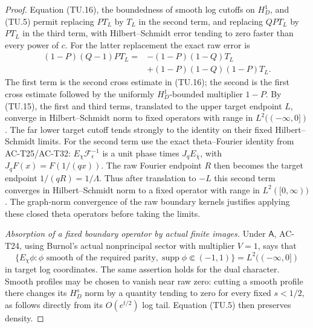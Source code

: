 \begin{proof}
Equation (TU.16), the boundedness of smooth log cutoffs
on \(H_D^1\), and (TU.5) permit replacing \(PT_L\) by
\(T_L\) in the second term, and replacing \(QPT_L\) by
\(PT_L\) in the third term, with Hilbert--Schmidt error
tending to zero faster than every power of \(c\).
For the latter replacement the exact raw error is
\[
 \begin{split}
 (1-P)(Q-1)PT_L
   ={}&-(1-P)(1-Q)T_L\\
      &+(1-P)(1-Q)(1-P)T_L.
 \end{split}
 \tag{TU.16a}
\]
The first term is the second cross estimate in (TU.16);
the second is the first cross estimate followed by the
uniformly \(H_D^1\)-bounded multiplier \(1-P\).
By (TU.15), the first and third terms, translated to the
upper target endpoint \(L\), converge in Hilbert--Schmidt
norm to fixed operators with range in \(L^2((-\infty,0])\).
The far lower target cutoff tends strongly to the identity
on their fixed Hilbert--Schmidt limits.
For the second term use the exact theta--Fourier identity
from AC-T25/AC-T32:
\(E_\chi\mathcal F_\epsilon^{-1}\) is a unit phase times
\(J_qE_{\bar\chi}\), with \(J_qF(x)=F(1/(qx))\).
The raw Fourier endpoint \(R\) then becomes the target
endpoint \(1/(qR)=1/\Lambda\).
Thus after translation to \(-L\) this second term converges
in Hilbert--Schmidt norm to a fixed operator with range
in \(L^2([0,\infty))\).
The graph-norm convergence of the raw boundary kernels
justifies applying these closed theta operators before
taking the limits.

\emph{Absorption of a fixed boundary operator by actual finite images.}
Under \(\mathsf A\), AC-T24, using Burnol's actual
nonprincipal sector with multiplier \(V=1\), says that
\[
 \overline{\{E_\chi\phi:
          \phi\text{ smooth of the required parity},
                    \operatorname{supp}\phi\Subset(-1,1)\}}
                  =L^2((-\infty,0])
 \tag{TU.18}
\]
in target log coordinates.
The same assertion holds for the dual character.
Smooth profiles may be chosen to vanish near raw zero:
cutting a smooth profile there changes its \(H_D^s\) norm
by a quantity tending to zero for every fixed \(s<1/2\),
as follows directly from its \(O(e^{t/2})\) log tail.
Equation (TU.5) then preserves density.


\end{proof}
